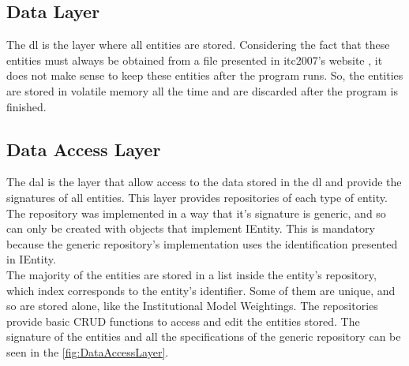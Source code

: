 \subsection{Data Layer}

The \gls{dl} is the layer where all entities are stored. Considering the fact that these entities must always be obtained from a file presented in \gls{itc2007}'s website \cite{McCollum2007a}, it does not make sense to keep these entities after the program runs. So, the entities are stored in volatile memory all the time and are discarded after the program is finished.

\subsection{Data Access Layer}

The \gls{dal} is the layer that allow access to the data stored in the \gls{dl} and provide the signatures of all entities. This layer provides repositories of each type of entity. The repository was implemented in a way that it's signature  is generic, and so can only be created with objects that implement IEntity. This is mandatory because the generic repository's implementation uses the identification presented in IEntity. \\

The majority of the entities are stored in a list inside the entity's repository, which index corresponds to the entity's identifier. Some of them are unique, and so are stored alone, like the Institutional Model Weightings. The repositories provide basic CRUD functions to access and edit the entities stored. The signature of the entities and all the specifications of the generic repository can be seen in the \ref{fig:DataAccessLayer}.\\

